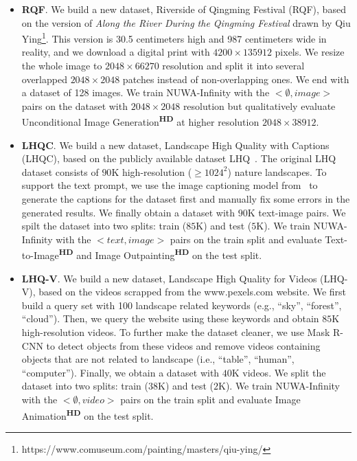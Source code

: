 \documentclass{article}
\begin{document}
\begin{itemize}[leftmargin=*]

\item \textbf{RQF}. We build a new dataset, Riverside of Qingming Festival (RQF), based on the version of \emph{\textit{Along the River During the Qingming Festival}} drawn by Qiu Ying\footnote{https://www.comuseum.com/painting/masters/qiu-ying/}. This version is 30.5 centimeters high and 987 centimeters wide in reality, and we download a digital print with $4200\times 135912$ pixels. We resize the whole image to $2048\times 66270$ resolution and split it into several overlapped $2048\times 2048$ patches instead of non-overlapping ones. We end with a dataset of 128 images.  We train NUWA-Infinity with the $<\emptyset, image>$ pairs on the dataset with $2048\times 2048$ resolution but qualitatively evaluate Unconditional Image Generation\textsuperscript{\textbf{HD}} at higher resolution $2048\times 38912$.


\item \textbf{LHQC}. We build a new dataset, Landscape High Quality with Captions (LHQC), based on the publicly available dataset LHQ~\cite{skorokhodovAligningLatentImage2021}. The original LHQ dataset consists of $90$K high-resolution ($\geqslant 1024^{2}$) nature landscapes. To support the text prompt, we use the image captioning model from~\cite{wangGITGenerativeImagetotext2022} to generate the captions for the dataset first and manually fix some errors in the generated results. We finally obtain a dataset with $90$K text-image pairs. We spilt the dataset into two splits: train ($85$K) and test ($5$K). We train NUWA-Infinity with the $<text, image>$ pairs on the train split and evaluate Text-to-Image\textsuperscript{\textbf{HD}} and Image Outpainting\textsuperscript{\textbf{HD}} on the test split.

\item \textbf{LHQ-V}. We build a new dataset, Landscape High Quality for Videos (LHQ-V), based on the videos scrapped from the www.pexels.com website. We first build a query set with 100 landscape related keywords (e.g., ``sky'', ``forest'', ``cloud''). Then, we query the website using these keywords and obtain $85$K high-resolution videos. To further make the dataset cleaner, we use Mask R-CNN \cite{heMaskRCNN2017} to detect objects from these videos and remove videos containing objects that are not related to landscape (i.e., ``table'', ``human'', ``computer''). Finally, we obtain a dataset with $40$K videos. We split the dataset into two splits: train ($38$K) and test ($2$K). We train NUWA-Infinity with the $<\emptyset, video>$ pairs on the train split and evaluate Image Animation\textsuperscript{\textbf{HD}} on the test split.


\end{itemize}
\end{document}
